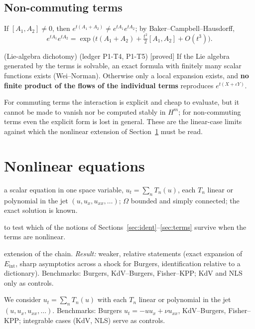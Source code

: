 \documentclass[11pt,a4paper]{article}
\theoremstyle{definition}
\newcommand{\badge}[2]{\textcolor{#1}{\textsf{\footnotesize[#2]}}}
\newcommand{\proved}[1][]{\badge{cC}{proved#1}}
\newcommand{\led}[1]{\textcolor{cG}{\textsf{\footnotesize(ledger #1)}}}
\newcommand{\sectionbrief}[3]{\begin{leadin}\begin{description}[nosep,leftmargin=3.0cm,labelwidth=2.8cm]
  \item[Starting from] #1
  \item[Why this section] #2
  \item[Role in the paper] #3
  \end{description}\end{leadin}}
\newcommand{\Eint}{E_{\mathrm{int}}}
\begin{document}
\subsection{Non-commuting terms}\label{sec:noncomm}
If $[A_1,A_2]\ne0$, then $e^{t(A_1+A_2)}\neq e^{tA_1}e^{tA_2}$; by Baker--Campbell--Hausdorff,
\[
e^{tA_1}e^{tA_2}=\exp\!\Big(t(A_1+A_2)+\tfrac{t^2}{2}[A_1,A_2]+O(t^3)\Big).
\]
\begin{proposition}{(Lie-algebra dichotomy) \led{P1-T4, P1-T5} \proved[]}
If the Lie algebra generated by the terms is solvable, an exact formula with finitely many scalar functions exists (Wei--Norman). Otherwise only a local expansion exists, and \textbf{no finite product of the flows of the individual terms} reproduces $e^{t(X+\varepsilon Y)}$.
\end{proposition}
\begin{takeaway}
For commuting terms the interaction is explicit and cheap to evaluate, but it cannot be made to vanish nor be computed stably in $H^m$; for non-commuting terms even the explicit form is lost in general. These are the linear-case limits against which the nonlinear extension of Section~\ref{sec:nonlin} must be read.
\end{takeaway}

\section{Nonlinear equations}\label{sec:nonlin}
\sectionbrief
{a scalar equation in one space variable, $u_t=\sum_nT_n(u)$, each $T_n$ linear or polynomial in the jet $(u,u_x,u_{xx},\dots)$; $\Omega$ bounded and simply connected; the exact solution is known.}
{to test which of the notions of Sections~\ref{sec:ident}--\ref{sec:terms} survive when the terms are nonlinear.}
{extension of the chain. \emph{Result:} weaker, relative statements (exact expansion of $\Eint$, sharp asymptotics across a shock for Burgers, identification relative to a dictionary). Benchmarks: Burgers, KdV--Burgers, Fisher--KPP; KdV and NLS only as controls.}
We consider $u_t=\sum_nT_n(u)$ with each $T_n$ linear or polynomial in the jet $(u,u_x,u_{xx},\dots)$. Benchmarks: Burgers $u_t=-uu_x+\nu u_{xx}$, KdV--Burgers, Fisher--KPP; integrable cases (KdV, NLS) serve as controls.
\end{document}
